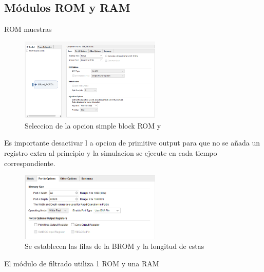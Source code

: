 \subsection{Módulos ROM y RAM}
 ROM muestras

\begin{figure}[h!]
    \centering
    \includegraphics[width=0.6\textwidth]{./Images/img_implementacion_hw/rom_muestras_1.png}
    \caption{Seleccion de la opcion simple block ROM y}
    \label{fig:rom_muestras_1}
\end{figure}
 Es importante desactivar l a opcion de primitive output para que no se añada un registro extra 
 al principio y la simulacion se ejecute en cada tiempo correspondiente. 
\begin{figure}[h!]
    \centering
    \includegraphics[width=0.6\textwidth]{./Images/img_implementacion_hw/rom_muestras_2.png}
    \caption{Se establecen las filas de la BROM y la longitud de estas}
    \label{fig:rom_muestras_2}
\end{figure}

El módulo de filtrado utiliza 1 ROM y una RAM

